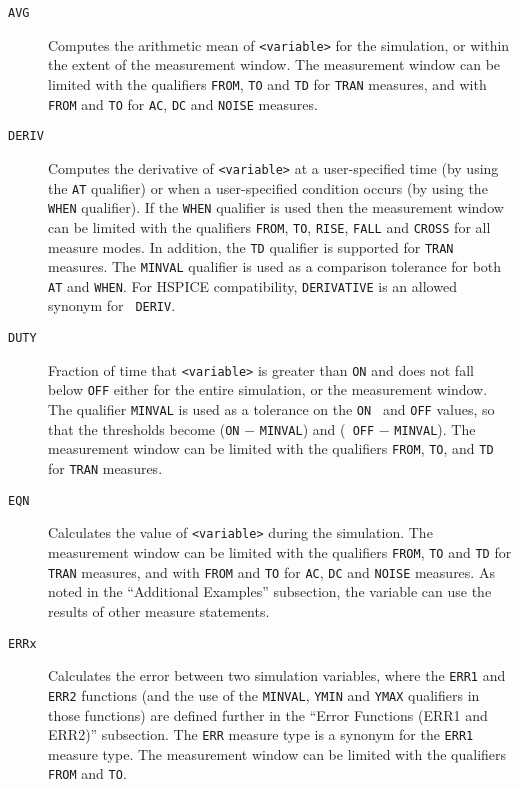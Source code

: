 \begin{Command}
\begin{Arguments}
\begin{description}
  \item[\tt AVG] Computes the arithmetic mean of {\tt <variable>} for
    the simulation, or within the extent of the measurement window.
    The measurement window can be limited with the qualifiers {\tt FROM},
    {\tt TO} and {\tt TD} for {\tt TRAN} measures, and with {\tt FROM}
    and {\tt TO} for {\tt AC}, {\tt DC} and {\tt NOISE} measures.

  \item[\tt DERIV] Computes the derivative of {\tt <variable>} at a
    user-specified time (by using the {\tt AT} qualifier) or when a
    user-specified condition occurs (by using the {\tt WHEN}
    qualifier). If the {\tt WHEN} qualifier is used then the
    measurement window can be limited with the qualifiers {\tt FROM},
    {\tt TO}, {\tt RISE}, {\tt FALL} and {\tt CROSS} for all measure
    modes.  In addition, the {\tt TD} qualifier is supported for
    {\tt TRAN} measures. The {\tt MINVAL} qualifier is used as a
    comparison tolerance for both {\tt AT} and {\tt WHEN}.  For HSPICE
    compatibility, {\tt DERIVATIVE} is an allowed synonym for {\tt
    DERIV}.

  \item[\tt DUTY] Fraction of time that {\tt <variable>} is greater than
   {\tt ON} and does not fall below {\tt OFF} either for the entire
    simulation, or the measurement window. The qualifier {\tt MINVAL}
    is used as a tolerance on the {\tt ON } and {\tt OFF} values, so
    that the thresholds become ({\tt ON} $-$ {\tt MINVAL}) and ({\tt
    OFF} $-$ {\tt MINVAL}).  The measurement window can be limited
    with the qualifiers {\tt FROM}, {\tt TO}, and {\tt TD} for
   {\tt TRAN} measures.

\item[\tt EQN] Calculates the value of {\tt <variable>} during the simulation.
    The measurement window can be limited with the qualifiers {\tt FROM},
    {\tt TO} and {\tt TD} for {\tt TRAN} measures, and with {\tt FROM}
    and {\tt TO} for {\tt AC}, {\tt DC} and {\tt NOISE} measures.  As noted in the
    ``Additional Examples'' subsection, the variable can use the
    results of other measure statements.

\item[\tt ERRx] Calculates the error between two simulation variables, where
    the {\tt ERR1} and {\tt ERR2} functions (and the use of the {\tt MINVAL},
    {\tt YMIN} and {\tt YMAX} qualifiers in those functions) are defined further
    in the ``Error Functions (ERR1 and ERR2)'' subsection.  The {\tt ERR} measure
    type is a synonym for  the {\tt ERR1} measure type.  The measurement
    window can be limited  with the qualifiers {\tt FROM} and {\tt TO}.


\end{description}
\end{Arguments}
\end{Command}
